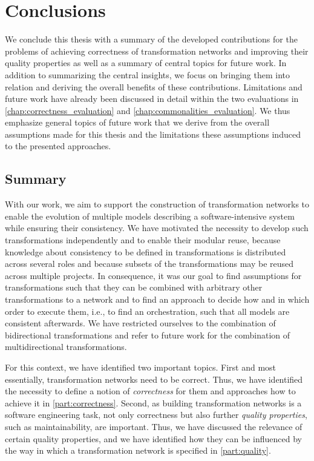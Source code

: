 \chapter{Conclusions
}
\label{chap:conclusions}

We conclude this thesis with a summary of the developed contributions for the problems of achieving correctness of transformation networks and improving their quality properties as well as a summary of central topics for future work.
In addition to summarizing the central insights, we focus on bringing them into relation and deriving the overall benefits of these contributions.
Limitations and future work have already been discussed in detail within the two evaluations in \autoref{chap:correctness_evaluation} and \autoref{chap:commonalities_evaluation}.
We thus emphasize general topics of future work that we derive from the overall assumptions made for this thesis and the limitations these assumptions induced to the presented approaches.


\section{Summary}

With our work, we aim to support the construction of transformation networks to enable the evolution of multiple models describing a software-intensive system while ensuring their consistency.
We have motivated the necessity to develop such transformations independently and to enable their modular reuse, because knowledge about consistency to be defined in transformations is distributed across several roles and because subsets of the transformations may be reused across multiple projects.
In consequence, it was our goal to find assumptions for transformations such that they can be combined with arbitrary other transformations to a network and to find an approach to decide how and in which order to execute them, i.e., to find an orchestration, such that all models are consistent afterwards.
We have restricted ourselves to the combination of bidirectional transformations and refer to future work for the combination of multidirectional transformations.

For this context, we have identified two important topics.
First and most essentially, transformation networks need to be correct.
Thus, we have identified the necessity to define a notion of \emph{correctness} for them and approaches how to achieve it in \autoref{part:correctness}.
Second, as building transformation networks is a software engineering task, not only correctness but also further \emph{quality properties}, such as maintainability, are important.
Thus, we have discussed the relevance of certain quality properties, and we have identified how they can be influenced by the way in which a transformation network is specified in \autoref{part:quality}.


